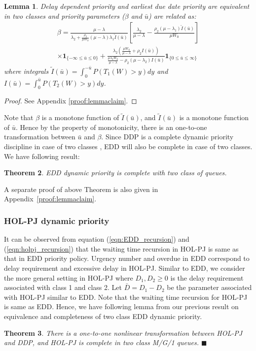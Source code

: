 \documentclass[letterpaper, 10 pt, conference]{ieeeconf}  %
\newtheorem{thm}{Theorem}[section]
\newtheorem{lem}[thm]{Lemma}
\begin{document}
\begin{lem}\label{clm:equivalenceDDPnEDD}
\textit{Delay dependent priority and earliest due date priority are equivalent in two classes and priority parameters ($\beta$ and $\bar{u}$) are related as:}
\begin{eqnarray}\nonumber
\beta = \frac{\mu-\lambda}{\lambda_2+\frac{\rho_2}{\mu W_0}(\mu-\lambda)\lambda_1 \tilde{I}(\bar{u})}\left[\frac{\lambda_2}{\mu - \lambda} - \frac{\rho_2(\mu-\lambda_1)\tilde{I}(\bar{u})}{\mu W_0}\right]\\\nonumber
 \times \mathbf{1}_{\{-\infty \le  \bar{u} \le 0\}} + \frac{\lambda_2\left( \frac{\mu W_0}{\mu-\lambda} + \rho_2 I(\bar{u})\right)}{\frac{\mu \lambda_2 W_0}{\mu-\lambda}	-\rho_2(\mu-\lambda_2)I(\bar{u})}\mathbf{1}_{\{0 \le  \bar{u} \le \infty\}}
\end{eqnarray}
where integrals $\tilde{I}(\bar{u})=\int_0^{-\bar{u}}P(T_1(W)>y)dy$ and $I(\bar{u})=\int_0^{\bar{u}}P(T_2(W)>y)dy$. 
\end{lem}
\begin{proof}
See Appendix \ref{proof:lemmaclaim}.
\end{proof}
Note that $\beta$ is a monotone function of $\tilde{I}(\bar{u})$, and $\tilde{I}(\bar{u})$ is a monotone function of $\bar{u}$. Hence by the property of monotonicity, there is an one-to-one transformation between $\bar{u}$ and $\beta$. Since DDP is a complete dynamic priority discipline in case of two classes \cite{federgruen}, EDD will also be complete in case of two classes. We have following result:
\begin{thm}\label{clm:EDDcomplete}
\textit{EDD dynamic priority is complete with two class of queues.}
\end{thm}  
A separate proof of above Theorem is also given in Appendix~\ref{proof:lemmaclaim}. 

\subsubsection{\textbf{HOL-PJ dynamic priority}}
It can be observed from equation (\ref{eqn:EDD_recursion}) and (\ref{eqn:holpj_recursion}) that the waiting time recursion in HOL-PJ is same as that in EDD priority policy. Urgency number and overdue in EDD correspond to delay requirement and excessive delay in HOL-PJ. Similar to EDD, we consider the more general setting in HOL-PJ where $D_1,D_2 \geq 0$ is the delay requirement associated with class 1 and class 2. Let $\bar{D} = D_1- D_2$ be the parameter associated with HOL-PJ similar to EDD. Note that the waiting time recursion for HOL-PJ is same as EDD. Hence, we have following lemma from our previous result on equivalence and completeness of two class EDD dynamic priority. 
\begin{thm}
\textit{There is a one-to-one nonlinear transformation between HOL-PJ and DDP, and HOL-PJ is complete in two class M/G/1 queues.} \hspace{4.8cm}$\blacksquare$
\end{thm}
\end{document}
